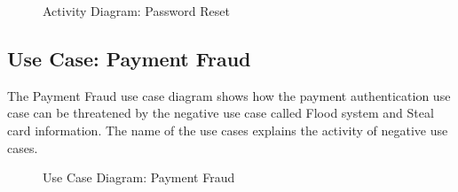 \documentclass[a4paper,12pt]{report}
\begin{document}
\begin{figure}[!htbp]
	\caption{\label{fig: act_password_reset } Activity Diagram: Password Reset}	
\end{figure}


\FloatBarrier
\subsection{Use Case: Payment Fraud}
The Payment Fraud use case diagram shows how the payment authentication use case can be threatened by the negative use case called Flood system and Steal card information. The name of the use cases explains the activity of negative use cases. \\

\begin{figure}[!htbp]
	\caption{\label{fig: uc_payment_fraud } Use Case Diagram: Payment Fraud}	
\end{figure}
\end{document}
